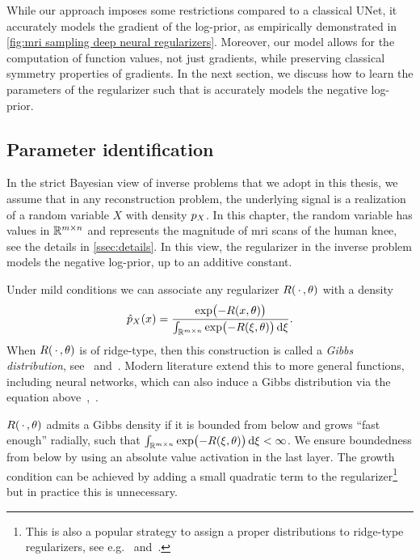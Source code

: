 While our approach imposes some restrictions compared to a classical UNet, it accurately models the gradient of the log-prior, as empirically demonstrated in \cref{fig:mri sampling deep neural regularizers}.
Moreover, our model allows for the computation of function values, not just gradients, while preserving classical symmetry properties of gradients.
In the next section, we discuss how to learn the parameters of the regularizer such that is accurately models the negative log-prior.
\subsection{Parameter identification}%
\label{ssec:methods ml}
In the strict Bayesian view of inverse problems that we adopt in this thesis, we assume that in any reconstruction problem, the underlying signal is a realization of a random variable \( X \) with density \( p_X \).
In this chapter, the random variable has values in \( \mathbb{R}^{m\times n} \) and represents the magnitude of \gls{mri} scans of the human knee, see the details in \cref{ssec:details}.
In this view, the regularizer in the inverse problem models the negative log-prior, up to an additive constant.

Under mild conditions we can associate any regularizer \( R(\,\cdot\,,\theta) \) with a density
\begin{equation}
	\hat{p}_{X}(x) = \frac{\exp\bigl(-R(x,\theta)\bigr)}{\int_{\mathbb{R}^{m\times n}}\exp\bigl(-R(\xi, \theta)\bigr)\,\mathrm{d}\xi}.
	\label{eq:gibbs}
\end{equation}
When \( R(\,\cdot\,, \theta) \) is of ridge-type, then this construction is called a \emph{Gibbs distribution}, see~\cite[theorem 1 and the two preceding definitions]{zhu_filters_1998} and~\cite[page 5]{geman_stochastic_1984}.
Modern literature extend this to more general functions, including neural networks, which can also induce a Gibbs distribution via the equation above~\cite[section 3.1]{nijkamp_shortrun_2019},~\cite[section 2.1]{nijkamp_anatomy_2019}.

\( R(\,\cdot\,, \theta) \) admits a Gibbs density if it is bounded from below and grows \enquote{fast enough} radially, such that \( \int_{\mathbb{R}^{m\times n}}\exp\bigl(-R(\xi, \theta)\bigr)\,\mathrm{d}\xi < \infty \).
We ensure boundedness from below by using an absolute value activation in the last layer.
The growth condition can be achieved by adding a small quadratic term to the regularizer\footnote{%
	This is also a popular strategy to assign a proper distributions to ridge-type regularizers, see e.g.~\cite[eq. (1)]{schmidt_generative_2010} and~\cite[eq. (6)]{weiss_model_2007}.
} but in practice this is unnecessary.

